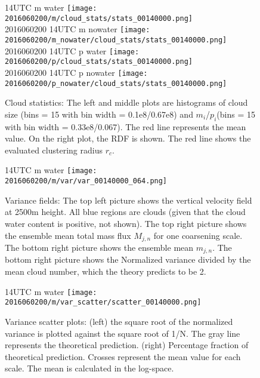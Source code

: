 \documentclass[a4paper, 12pt]{article}
\begin{document}
\begin{figure}[ht] \label{fig:case1_stats}
\noindent {} 14UTC m water
\texttt{[image: 2016060200/m/cloud\_stats/stats\_00140000.png]}\\
2016060200 14UTC m nowater
\texttt{[image: 2016060200/m\_nowater/cloud\_stats/stats\_00140000.png]}\\
2016060200 14UTC p water
\texttt{[image: 2016060200/p/cloud\_stats/stats\_00140000.png]}\\
2016060200 14UTC p nowater
\texttt{[image: 2016060200/p\_nowater/cloud\_stats/stats\_00140000.png]}\\
\caption{Cloud statistics: The left and middle plots are histograms of cloud size (bins = 15 with bin width = 0.1e8/0.67e8) and $m_i$/$p_i$(bins = 15 with bin width = 0.33e8/0.067). The red line represents the mean value. On the right plot, the RDF is shown. The red line shows the evaluated clustering radius $r_c$.}
\end{figure}

\begin{figure}[ht] \label{fig:case1_var_fields}
\noindent {} 14UTC m water
\texttt{[image: 2016060200/m/var/var\_00140000\_064.png]}\\
\caption{Variance fields:  The top left picture shows the vertical velocity field at 2500m height. All blue regions are clouds (given that the cloud water content is positive, not shown). The top right picture shows the ensemble mean total mass flux $M_{j,n}$ for one coarsening scale. The bottom right picture shows the ensemble mean $m_{j,n}$. The bottom right picture shows the Normalized variance divided by the mean cloud number, which the theory predicts to be 2.}
\end{figure}

\begin{figure}[ht] \label{fig:case1_var_scatter}
\noindent {} 14UTC m water
\texttt{[image: 2016060200/m/var\_scatter/scatter\_00140000.png]}\\
\caption{Variance scatter plots: (left) the square root of the normalized variance is plotted against the square root of 1/N. The gray line represents the theoretical prediction. (right) Percentage fraction of theoretical prediction. Crosses represent the mean value for each scale. The mean is calculated in the log-space.}
\end{figure}
\end{document}
